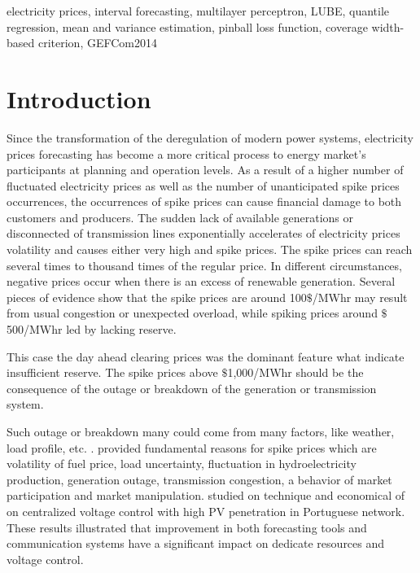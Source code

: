 \documentclass[review]{elsarticle}
\begin{document}
\begin{frontmatter}
    \begin{keyword}
      electricity prices, interval forecasting, multilayer perceptron, LUBE, quantile regression, mean and variance estimation, pinball loss function, coverage width-based criterion, GEFCom2014
    \end{keyword}

  \end{frontmatter}

  \linenumbers

  \section{Introduction}

  Since the transformation of the deregulation of modern power systems, electricity prices forecasting has become a more critical process to energy market's participants at planning and operation levels.
  As a result of a higher number of fluctuated electricity prices as well as the number of unanticipated spike prices occurrences, the occurrences of spike prices can cause financial damage to both customers and producers.
  The sudden lack of available generations or disconnected of transmission lines exponentially accelerates of electricity prices volatility and causes either very high and spike prices.
  The spike prices can reach several times to thousand times of the regular price.
  In different circumstances, negative prices occur when there is an excess of renewable generation.
  Several pieces of evidence show that the spike prices are around 100$\$$/MWhr may result from usual congestion or unexpected overload, while spiking prices around $\$$500/MWhr led by lacking reserve.

  This case the day ahead clearing prices was the dominant feature what indicate insufficient reserve.
  The spike prices above $\$$1,000/MWhr should be the consequence of the outage or breakdown of the generation or transmission system.

  Such outage or breakdown many could come from many factors, like weather, load profile, etc. \cite{He2016}.
  \cite{SINGHAL2011550} provided fundamental reasons for spike prices which are volatility of fuel price, load uncertainty, fluctuation in hydroelectricity production, generation outage, transmission congestion, a behavior of market participation and market manipulation.
  \cite{GONZALEZSOTRES2017338} studied on technique and economical of on centralized voltage control with high PV penetration in Portuguese network.
  These results illustrated that improvement in both forecasting tools and communication systems have a significant impact on dedicate resources and voltage control.
\end{document}
